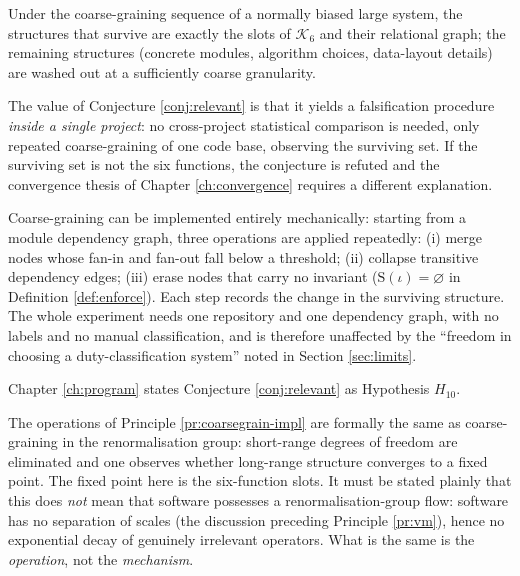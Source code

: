 \begin{conjecture}\label{conj:relevant}
Under the coarse-graining sequence of a normally biased large system, the structures that
survive are exactly the slots of $\mathcal{K}_6$ and their relational graph; the remaining
structures (concrete modules, algorithm choices, data-layout details) are washed out at a
sufficiently coarse granularity.
\end{conjecture}

The value of Conjecture \ref{conj:relevant} is that it yields a falsification procedure
\emph{inside a single project}: no cross-project statistical comparison is needed, only
repeated coarse-graining of one code base, observing the surviving set. If the surviving set
is not the six functions, the conjecture is refuted and the convergence thesis of
Chapter \ref{ch:convergence} requires a different explanation.

\begin{principle}\label{pr:coarsegrain-impl}
Coarse-graining can be implemented entirely mechanically: starting from a module dependency
graph, three operations are applied repeatedly: (i) merge nodes whose fan-in and fan-out
fall below a threshold; (ii) collapse transitive dependency edges; (iii) erase nodes that
carry no invariant ($\mathrm{S}(\iota) = \varnothing$ in Definition \ref{def:enforce}).
Each step records the change in the surviving structure. The whole experiment needs one
repository and one dependency graph, with no labels and no manual classification, and is
therefore unaffected by the ``freedom in choosing a duty-classification system'' noted in
Section \ref{sec:limits}.
\end{principle}

Chapter \ref{ch:program} states Conjecture \ref{conj:relevant} as Hypothesis $H_{10}$.

\begin{remark}\label{rmk:rg}
The operations of Principle \ref{pr:coarsegrain-impl} are formally the same as
coarse-graining in the renormalisation group: short-range degrees of freedom are eliminated
and one observes whether long-range structure converges to a fixed point. The fixed point
here is the six-function slots. It must be stated plainly that this does \emph{not} mean
that software possesses a renormalisation-group flow: software has no separation of scales
(the discussion preceding Principle \ref{pr:vm}), hence no exponential decay of genuinely
irrelevant operators. What is the same is the \emph{operation}, not the \emph{mechanism}.
\end{remark}

